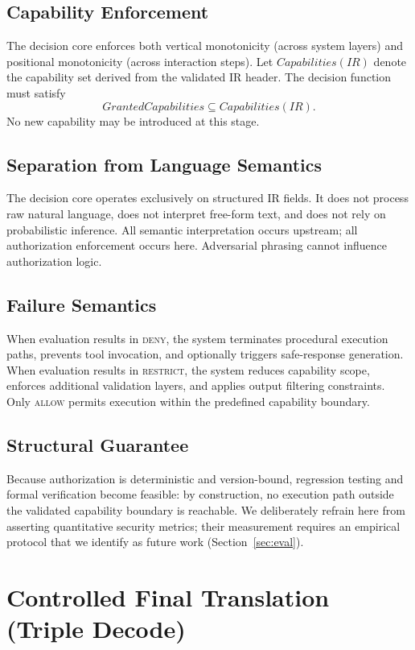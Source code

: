 \documentclass[conference]{IEEEtran}
\begin{document}
\subsection{Capability Enforcement}
The decision core enforces both vertical monotonicity (across system
layers) and positional monotonicity (across interaction steps). Let
$\mathit{Capabilities}(IR)$ denote the capability set derived from the
validated IR header. The decision function must satisfy
\[
\mathit{GrantedCapabilities} \subseteq \mathit{Capabilities}(IR).
\]
No new capability may be introduced at this stage.

\subsection{Separation from Language Semantics}
The decision core operates exclusively on structured IR fields. It does
not process raw natural language, does not interpret free-form text, and
does not rely on probabilistic inference. All semantic interpretation
occurs upstream; all authorization enforcement occurs here. Adversarial
phrasing cannot influence authorization logic.

\subsection{Failure Semantics}
When evaluation results in \textsc{deny}, the system terminates procedural
execution paths, prevents tool invocation, and optionally triggers
safe-response generation. When evaluation results in \textsc{restrict},
the system reduces capability scope, enforces additional validation
layers, and applies output filtering constraints. Only \textsc{allow}
permits execution within the predefined capability boundary.

\subsection{Structural Guarantee}
Because authorization is deterministic and version-bound, regression
testing and formal verification become feasible: by construction, no
execution path outside the validated capability boundary is reachable. We
deliberately refrain here from asserting quantitative security metrics;
their measurement requires an empirical protocol that we identify as
future work (Section~\ref{sec:eval}).

\section{Controlled Final Translation (Triple Decode)}
\label{sec:triple}
\end{document}
